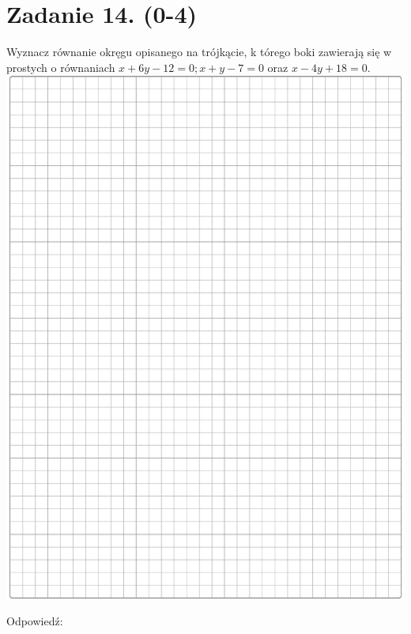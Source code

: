 \documentclass[10pt]{article}
\begin{document}
\section*{Zadanie 14. (0-4)}
Wyznacz równanie okręgu opisanego na trójkącie, k tórego boki zawierają się w prostych o równaniach \(x+6 y-12=0 ; x+y-7=0\) oraz \(x-4 y+18=0\).\\
\includegraphics[max width=\textwidth, center]{2024_11_21_d15133c79177ee6989d3g-09}

Odpowiedź: \(\qquad\)
\end{document}
